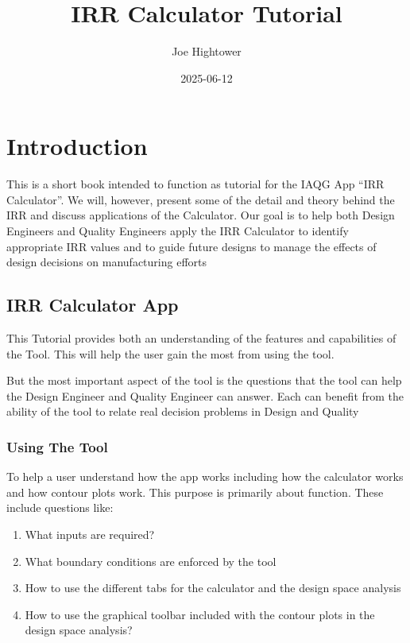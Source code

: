 \documentclass[
]{article}
\title{IRR Calculator Tutorial}
\author{Joe Hightower}
\date{2025-06-12}
\providecommand{\tightlist}{%
  \setlength{\itemsep}{0pt}\setlength{\parskip}{0pt}}
\begin{document}
\maketitle

{
\hypersetup{linkcolor=}
\setcounter{tocdepth}{2}
\tableofcontents
}
\section{Introduction}\label{introduction}

This is a short book intended to function as tutorial for the IAQG App ``IRR Calculator''. We will, however, present some of the detail and theory behind the IRR and discuss applications of the Calculator. Our goal is to help both Design Engineers and Quality Engineers apply the IRR Calculator to identify appropriate IRR values and to guide future designs to manage the effects of design decisions on manufacturing efforts

\subsection{IRR Calculator App}\label{irr-calculator-app}

This Tutorial provides both an understanding of the features and capabilities of the Tool. This will help the user gain the most from using the tool.

But the most important aspect of the tool is the questions that the tool can help the Design Engineer and Quality Engineer can answer. Each can benefit from the ability of the tool to relate real decision problems in Design and Quality

\subsubsection{Using The Tool}\label{using-the-tool}

To help a user understand how the app works including how the calculator works and how contour plots work. This purpose is primarily about function. These include questions like:

\begin{enumerate}
\def\labelenumi{\arabic{enumi}.}
\tightlist
\item
  What inputs are required?
\item
  What boundary conditions are enforced by the tool
\item
  How to use the different tabs for the calculator and the design space analysis
\item
  How to use the graphical toolbar included with the contour plots in the design space analysis?
\end{enumerate}
\end{document}
